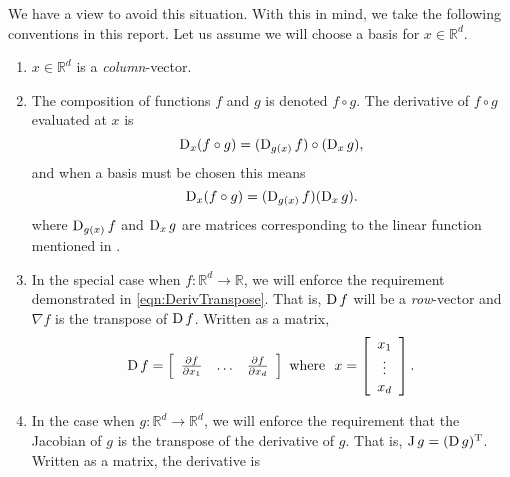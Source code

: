     We have a view to avoid this situation. With this in mind, we take 
    the following conventions in this report. 
    Let us assume we will choose a basis for \(x \in \mathbb{R}^d\).
    \begin{enumerate}
        \item \(x \in \mathbb{R}^d\) is a \emph{column}-vector.
        \item The composition of functions \(f\) and \(g\) is denoted \(f \circ g\). The
                derivative of \(f \circ g\) evaluated at \(x\) is
                \[
                    \operatorname{D}_x(f \circ g) = (\operatorname{D}_{g(x)} f) \circ (\operatorname{D}_x g),
                \]
                and when a basis must be chosen this means
                \[
                    \operatorname{D}_x(f \circ g) = (\operatorname{D}_{g(x)} f)(\operatorname{D}_x g).
                \]
                where \(\operatorname{D}_{g(x)} f\) and \(\operatorname{D}_x g\) are matrices
                corresponding to the linear function mentioned
                in .
        \item In the special case when \(f:\mathbb{R}^d \to \mathbb{R}\),
                we will enforce the requirement demonstrated in
                \autoref{eqn:DerivTranspose}. That is,
                \(\operatorname{D} f\) will be a \emph{row}-vector and \(\nabla f\)
                is the transpose of \(\operatorname{D} f\). Written as a matrix,
                \[
                    \operatorname{D} f = 
                        \left[ 
                            \begin{array}{ccc}
                                \frac{\partial f}{\partial x_1} & \dots & \frac{\partial f}{\partial x_d} 
                            \end{array}
                        \right] 
                    \text{  where  }~ 
                    x = 
                        \left[
                            \begin{array}{c}
                                x_1 \\
                                \vdots \\
                                x_d
                            \end{array}
                        \right].
                \]
        \item In the case when \(g:\mathbb{R}^d \to \mathbb{R}^d\), we
                will enforce the requirement that the Jacobian of \(g\)
                is the transpose of the derivative of \(g\). That is,
                \(\operatorname{J} g = (\operatorname{D} g)^{\mathrm{T}}\). Written as a matrix, the
                derivative is

\end{enumerate}
